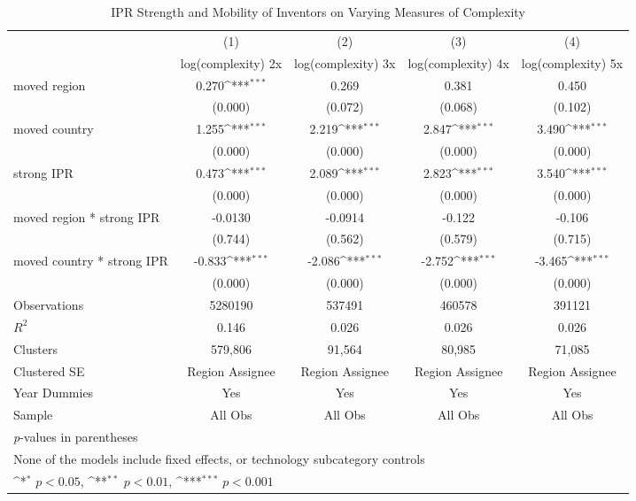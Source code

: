 {
\def\sym#1{\ifmmode^{#1}\else\(^{#1}\)\fi}
\begin{longtable}{l*{4}{c}}
\caption{IPR Strength and Mobility of Inventors on Varying Measures of Complexity \label{model3a3b3c3d}}\\
\hline\hline\endfirsthead\hline\endhead\hline\endfoot\endlastfoot
                &\multicolumn{1}{c}{(1)}&\multicolumn{1}{c}{(2)}&\multicolumn{1}{c}{(3)}&\multicolumn{1}{c}{(4)}\\
                &\multicolumn{1}{c}{log(complexity) 2x}&\multicolumn{1}{c}{log(complexity) 3x}&\multicolumn{1}{c}{log(complexity) 4x}&\multicolumn{1}{c}{log(complexity) 5x}\\
\hline
moved region    &    0.270\sym{***}&    0.269         &    0.381         &    0.450         \\
                &  (0.000)         &  (0.072)         &  (0.068)         &  (0.102)         \\
moved country   &    1.255\sym{***}&    2.219\sym{***}&    2.847\sym{***}&    3.490\sym{***}\\
                &  (0.000)         &  (0.000)         &  (0.000)         &  (0.000)         \\
strong IPR      &    0.473\sym{***}&    2.089\sym{***}&    2.823\sym{***}&    3.540\sym{***}\\
                &  (0.000)         &  (0.000)         &  (0.000)         &  (0.000)         \\
moved region * strong IPR&  -0.0130         &  -0.0914         &   -0.122         &   -0.106         \\
                &  (0.744)         &  (0.562)         &  (0.579)         &  (0.715)         \\
moved country * strong IPR&   -0.833\sym{***}&   -2.086\sym{***}&   -2.752\sym{***}&   -3.465\sym{***}\\
                &  (0.000)         &  (0.000)         &  (0.000)         &  (0.000)         \\
\hline
Observations    &  5280190         &   537491         &   460578         &   391121         \\
$R^2$              &    0.146         &    0.026         &    0.026         &    0.026         \\
Clusters         &  579,806         &   91,564         &   80,985         &   71,085         \\
Clustered SE       &Region Assignee         &Region Assignee         &Region Assignee         &Region Assignee         \\
Year Dummies            &      Yes         &      Yes         &      Yes         &      Yes         \\
Sample          &  All Obs         &  All Obs         &  All Obs         &  All Obs         \\
\hline\hline
\multicolumn{5}{l}{\footnotesize \textit{p}-values in parentheses}\\
\multicolumn{5}{l}{\footnotesize None of the models include fixed effects, or technology subcategory controls}\\
\multicolumn{5}{l}{\footnotesize \sym{*} \(p<0.05\), \sym{**} \(p<0.01\), \sym{***} \(p<0.001\)}\\
\end{longtable}
}
